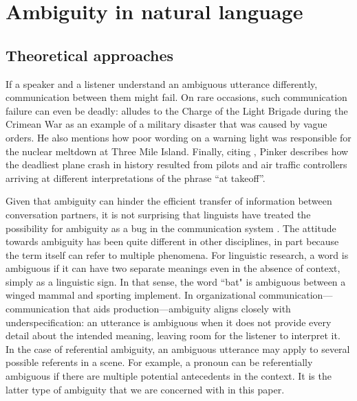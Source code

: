 \documentclass[11pt,a4paper]{article}
\begin{document}


\section{Ambiguity in natural language}
\subsection{Theoretical approaches}

If a speaker and a listener understand an ambiguous utterance differently, communication between them might fail.
On rare occasions, such communication failure can even be deadly: 
 alludes to the Charge of the Light Brigade during the Crimean War as an example of a military disaster that was caused by vague orders.
He also mentions how poor wording on a warning light was responsible for the nuclear meltdown at Three Mile Island. Finally, citing , Pinker describes how the deadliest plane crash in history resulted from pilots and air traffic controllers arriving at different interpretations of the phrase ``at takeoff''.

Given that ambiguity can hinder the efficient transfer of information between conversation partners, it is not surprising that linguists have treated the possibility for ambiguity as a bug in the communication system \cite{grice1975,chomsky2002minimalism}. The attitude towards ambiguity has been quite different in other disciplines, in part because the term itself can refer to multiple phenomena. For linguistic research, a word is ambiguous if it can have two separate meanings even in the absence of context, simply as a linguistic sign. In that sense, the word ``bat" is ambiguous between a winged mammal and sporting implement. In organizational communication---communication that aids production---ambiguity aligns closely with underspecification: an utterance is ambiguous when it does not provide every detail about the intended meaning, leaving room for the listener to interpret it. In the case of referential ambiguity, an ambiguous utterance may apply to several possible referents in a scene. For example, a pronoun can be referentially ambiguous if there are multiple potential antecedents in the context. It is the latter type of ambiguity that we are concerned with in this paper.
\end{document}
